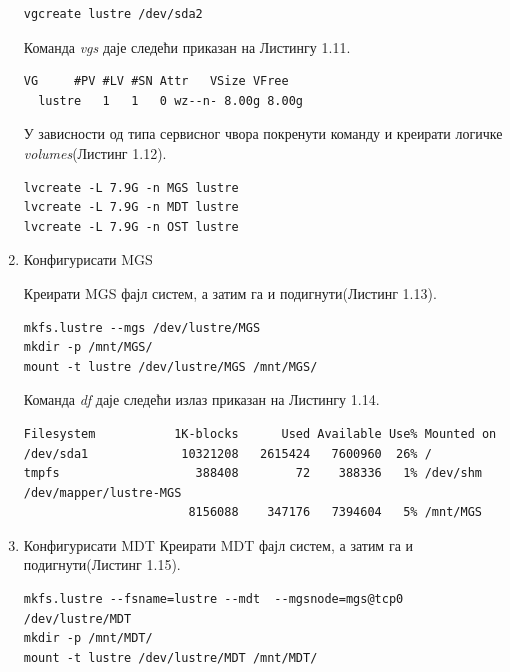\begin{enumerate}
\begin{verbatim}
vgcreate lustre /dev/sda2
\end{verbatim}

Команда \textit{vgs} даје следећи приказан на Листингу 1.11.

\begin{lstlisting}[style=nonumbers,frame=single, caption=Излаз команде \textit{vgs}]
  VG     #PV #LV #SN Attr   VSize VFree 
  lustre   1   1   0 wz--n- 8.00g 8.00g
\end{lstlisting}

У зависности од типа сервисног чвора покренути команду и креирати логичке \textit{volumes}(Листинг 1.12).

\begin{lstlisting}[style=nonumbers,frame=single, caption=Креирање логичких \textit{volumes}]
lvcreate -L 7.9G -n MGS lustre
lvcreate -L 7.9G -n MDT lustre
lvcreate -L 7.9G -n OST lustre
\end{lstlisting}


\item Конфигурисати MGS

Креирати MGS фајл систем, а затим га и подигнути(Листинг 1.13).
\begin{lstlisting}[style=nonumbers,frame=single, caption=Креирање MGS фајл систем]
mkfs.lustre --mgs /dev/lustre/MGS
mkdir -p /mnt/MGS/
mount -t lustre /dev/lustre/MGS /mnt/MGS/ 
\end{lstlisting}


Команда  \textit{df} даје следећи излаз приказан на Листингу 1.14.
\begin{lstlisting}[style=nonumbers,frame=single, caption= Излаз \textit{df} команде]
Filesystem           1K-blocks      Used Available Use% Mounted on
/dev/sda1             10321208   2615424   7600960  26% /
tmpfs                   388408        72    388336   1% /dev/shm
/dev/mapper/lustre-MGS
                       8156088    347176   7394604   5% /mnt/MGS
\end{lstlisting}


\item Конфигурисати MDT 
Креирати MDT фајл систем, а затим га и подигнути(Листинг 1.15).

\begin{lstlisting}[style=nonumbers,frame=single, caption=Креирање MDT фајл систем]
mkfs.lustre --fsname=lustre --mdt  --mgsnode=mgs@tcp0 /dev/lustre/MDT 
mkdir -p /mnt/MDT/
mount -t lustre /dev/lustre/MDT /mnt/MDT/ 
\end{lstlisting}



\end{enumerate}
